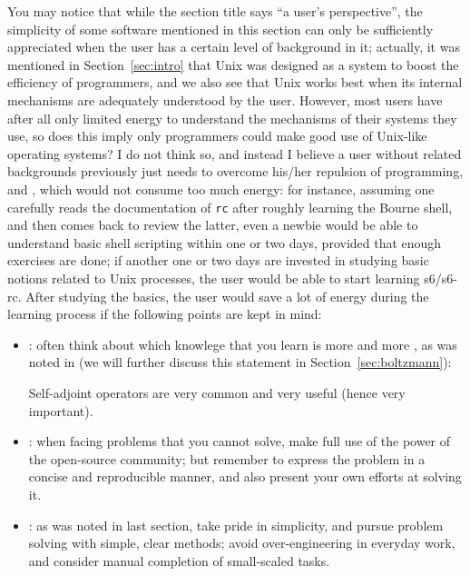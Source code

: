 You may notice that while the section title says ``a user's perspective'', the
simplicity of some software mentioned in this section can only be sufficiently
appreciated when the user has a certain level of background in it; actually,
it was mentioned in Section~\ref{sec:intro} that Unix was designed as a system
to boost the efficiency of programmers, and we also see that Unix works best
when its internal mechanisms are adequately understood by the user.  However,
most users have after all only limited energy to understand the mechanisms of
their systems they use, so does this imply only programmers could make good
use of Unix-like operating systems?  I do not think so, and instead I believe
a user without related backgrounds previously just needs to overcome his/her
repulsion of programming, and ,
which would not consume too much energy: for instance, assuming one carefully
reads the documentation of \verb|rc| after roughly learning the Bourne shell,
and then comes back to review the latter, even a newbie would be able to
understand basic shell scripting within one or two days, provided that enough
exercises are done; if another one or two days are invested in studying basic
notions related to Unix processes, the user would be able to start learning
s6/s6-rc.  After studying the basics, the user would save a lot of energy
during the learning process if the following points are kept in mind:
\begin{itemize}
\item {}:
	often think about which knowlege that you learn is more 
	and more , as was noted in \parencite{dodson1991} (we
	will further discuss this statement in Section~\ref{sec:boltzmann}):
\begin{quoting}
	Self-adjoint operators are very common
	and very useful (hence very important).
\end{quoting}
\item {}:
	when facing problems that you cannot solve, make full use of the power of
	the open-source community; but remember to express the problem in a concise
	and reproducible manner, and also present your own efforts at solving it.
\item {}:
	as was noted in last section, take pride in simplicity, and pursue problem
	solving with simple, clear methods; avoid over-engineering in everyday
	work, and consider manual completion of small-scaled tasks.
\end{itemize}

